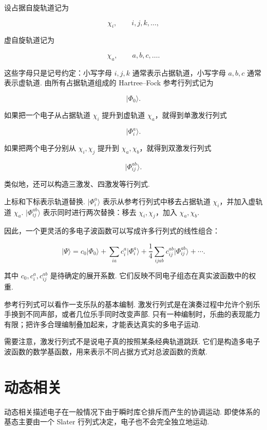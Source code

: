 \documentclass[UTF8,11pt,a4paper,openany]{ctexbook}
\newcommand{\ket}[1]{\lvert #1\rangle}\newcommand{\bra}[1]{\langle #1\rvert}
\begin{document}
设占据自旋轨道记为

\[
\chi_i,\qquad i,j,k,\ldots,
\]

虚自旋轨道记为

\[
\chi_a,\qquad a,b,c,\ldots.
\]

这些字母只是记号约定：小写字母 $i,j,k$ 通常表示占据轨道，小写字母 $a,b,c$ 通常表示虚轨道. 由所有占据轨道组成的 Hartree--Fock 参考行列式记为

\[
\ket{\Phi_0}.
\]

如果把一个电子从占据轨道 $\chi_i$ 提升到虚轨道 $\chi_a$，就得到单激发行列式

\[
\ket{\Phi_i^a}.
\]

如果把两个电子分别从 $\chi_i,\chi_j$ 提升到 $\chi_a,\chi_b$，就得到双激发行列式

\[
\ket{\Phi_{ij}^{ab}}.
\]

类似地，还可以构造三激发、四激发等行列式. 

\begin{notationbox}
上标和下标表示轨道替换. $\ket{\Phi_i^a}$ 表示从参考行列式中移去占据轨道 $\chi_i$，并加入虚轨道 $\chi_a$. $\ket{\Phi_{ij}^{ab}}$ 表示同时进行两次替换：移去 $\chi_i,\chi_j$，加入 $\chi_a,\chi_b$. 
\end{notationbox}

因此，一个更灵活的多电子波函数可以写成许多行列式的线性组合：

\[
\ket{\Psi}
=
c_0\ket{\Phi_0}
+
\sum_{ia}c_i^a\ket{\Phi_i^a}
+
\frac{1}{4}\sum_{ijab}c_{ij}^{ab}\ket{\Phi_{ij}^{ab}}
+\cdots.
\]

其中 $c_0,c_i^a,c_{ij}^{ab}$ 是待确定的展开系数. 它们反映不同电子组态在真实波函数中的权重. 

\begin{analogybox}
参考行列式可以看作一支乐队的基本编制. 激发行列式是在演奏过程中允许个别乐手换到不同声部，或者几位乐手同时改变声部. 只有一种编制时，乐曲的表现能力有限；把许多合理编制叠加起来，才能表达真实的多电子运动. 
\end{analogybox}

需要注意，激发行列式不是说电子真的按照某条经典轨道跳跃. 它们是构造多电子波函数的数学基函数，用来表示不同占据方式对总波函数的贡献. 

\section{动态相关}

动态相关描述电子在一般情况下由于瞬时库仑排斥而产生的协调运动. 即使体系的基态主要由一个 Slater 行列式决定，电子也不会完全独立地运动. 
\end{document}
